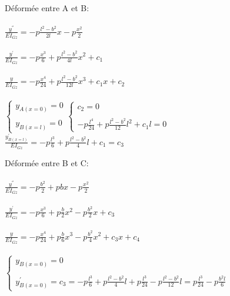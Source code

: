 \documentclass[a4paper]{article}
\begin{document}
~\\
~\\
~\\
\begin{minipage}[t]{9cm}
Déformée entre A et B:\\
~\\
$\frac{y^{''}}{EI_{Gz}} = - p\frac{l^2-b^2}{2l}x - p\frac{x^2}{2}$\\
~\\
$\frac{y^{'}}{EI_{Gz}} = -p\frac{x^3}{6} + p\frac{l^2-b^2}{4l}x^2 + c_1$\\
~\\
$\frac{y}{EI_{Gz}} = -p\frac{x^4}{24} + p\frac{l^2-b^2}{12l}x^3 + c_1x + c_2$\\
~\\
$\begin{cases}
y_{A(x=0)} = 0\\
~\\
y_{B(x=l)} = 0
\end{cases}
\begin{cases}
c_2 = 0\\
~\\
-p\frac{l^4}{24} + p\frac{l^2-b^2}{12}l^2 + c_1l = 0
\end{cases}$
~\\
$\frac{y^{'}_{B(x=l)}}{EI_{Gz}} =
 -p\frac{l^3}{6} + p\frac{l^2-b^2}{4}l + c_1 = c_3$
\end{minipage}
\begin{minipage}[t]{10cm}
Déformée entre B et C:\\
~\\
$\frac{y^{''}}{EI_{Gz}} = -p\frac{b^2}{2} + pbx - p\frac{x^2}{2}$\\
~\\
$\frac{y^{'}}{EI_{Gz}} =
 -p\frac{x^3}{6} + p\frac{b}{2}x^2 - p\frac{b^2}{2}x + c_3$\\
~\\
$\frac{y}{EI_{Gz}} =
 -p\frac{x^4}{24} + p\frac{b}{6}x^3 - p\frac{b^2}{4}x^2 + c_3x + c_4$\\
~\\
$\begin{cases}
y_{B(x=0)} = 0\\
~\\
y^{'}_{B(x=0)} = c_3 = -p\frac{l^3}{6} + p\frac{l^2-b^2}{4}l +
 p\frac{l^3}{24} - p\frac{l^2-b^2}{12}l = p\frac{l^3}{24} - p\frac{b^2l}{6}
\end{cases}$\\
\end{minipage}
\end{document}
